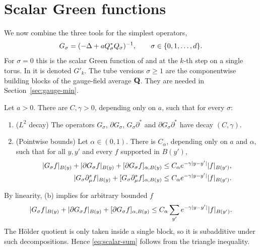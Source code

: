 \section{Scalar Green functions}\label{sec:scalar}

We now combine the three tools for the simplest operators,
\[
G_\sigma=(-\Delta+aQ_\sigma^*Q_\sigma)^{-1},\qquad\sigma\in\{0,1,\dots,d\}.
\]
For $\sigma=0$ this is the scalar Green function of \cite{BalGreen} and \cite{DST1} at the $k$-th step on a single torus. In \cite{BalPropI} it is denoted $G'_k$. The tube versions $\sigma\ge1$ are the componentwise building blocks of the gauge-field average $\mathbf Q$. They are needed in Section~\ref{sec:gauge-min}.

\begin{theorem}\label{thm:scalar-green}
Let $a>0$. There are $C,\gamma>0$, depending only on $a$, such that for every $\sigma$:
\begin{enumerate}[label=(\alph*)]
\item ($L^2$ decay) The operators $G_\sigma$, $\partial G_\sigma$, $G_\sigma\partial^*$ and $\partial G_\sigma\partial^*$ have decay $(C,\gamma)$.
\item (Pointwise bounds) Let $\alpha\in(0,1)$. There is $C_\alpha$, depending only on $a$ and $\alpha$, such that for all $y,y'$ and every $f$ supported in $B(y')$,
\begin{align*}
|G_\sigma f|_{B(y)}+|\partial G_\sigma f|_{B(y)}+[\partial G_\sigma f]_{\alpha,B(y)}&\le C_\alpha e^{-\gamma|y-y'|}|f|_{B(y')},\\
|G_\sigma\partial^*_\mu f|_{B(y)}+[G_\sigma\partial^*_\mu f]_{\alpha,B(y)}&\le C_\alpha e^{-\gamma|y-y'|}|f|_{B(y')}.
\end{align*}
\end{enumerate}
\end{theorem}

By linearity, (b) implies for arbitrary bounded $f$
\begin{equation}\label{eq:scalar-sum}
|G_\sigma f|_{B(y)}+|\partial G_\sigma f|_{B(y)}+[\partial G_\sigma f]_{\alpha,B(y)}\le C_\alpha\sum_{y'}e^{-\gamma|y-y'|}|f|_{B(y')}.
\end{equation}
The H\"older quotient is only taken inside a single block, so it is subadditive under such decompositions. Hence \eqref{eq:scalar-sum} follows from the triangle inequality.

